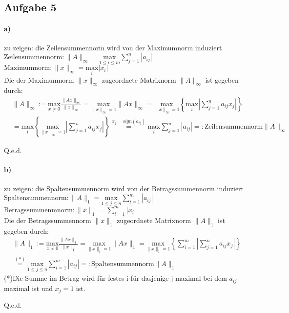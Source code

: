 \newpage
\subsection*{Aufgabe 5}
\paragraph*{a)}
zu zeigen: die Zeilensummennorm wird von der Maximumnorm induziert\\
\newline
$\mathrm{Zeilensummennorm: }\|A\|_\infty=\underset{1 \le i \le m}{\mathrm{max}} \sum_{j=1}^{n}|a_{ij}|$\\
\newline
$\mathrm{Maximumnorm: }\|x\|_\infty=\underset{i}{\mathrm{max}} |x_{i}|$\\
\newline
Die der Maximumnorm $\|x\|_\infty$ zugeordnete Matrixnorm $\|A\|_\infty$ ist gegeben durch:
\begin{align*}
&\|A\|_\infty := \underset{x\neq 0}{\mathrm{max}} \frac{\|Ax\|_\infty}{\|x\|_\infty} = 
\underset{\|x\|_\infty=1}{\mathrm{max}} \|Ax\|_\infty =
\underset{\|x\|_\infty=1}{\mathrm{max}}\left\lbrace \underset{i}{\mathrm{max}}\left|\sum_{j=1}^{n}a_{ij}x_j\right|\right\rbrace\\&=
\underset{i}{\mathrm{max}}\left\lbrace\underset{\|x\|_\infty=1}{\mathrm{max}}\left|\sum_{j=1}^{n} a_{ij}x_j\right|\right\rbrace
\overset{x_j=sign(a_{ij})}{=}\underset{i}{\mathrm{max}}\sum_{j=1}^{n}|a_{ij}|=: \mathrm{Zeilensummennorm} \|A\|_\infty
\end{align*}
\begin{flushright}Q.e.d.\end{flushright}

\paragraph*{b)}
zu zeigen: die Spaltensummennorm wird von der Betragssummennorm induziert\\
\newline
$\mathrm{Spaltensummennorm: }\|A\|_1=\underset{1 \le j \le n}{\mathrm{max}} \sum_{i=1}^{m}|a_{ij}|$\\
\newline
$\mathrm{Betragssummenmnorm: }\|x\|_1=\sum_{i=1}^{m}|x_i|$\\
\newline
Die der Betragssummennorm $\|x\|_1$ zugeordnete Matrixnorm $\|A\|_1$ ist gegeben durch:
\begin{align}
\|A\|_1 := \underset{x\neq 0}{\mathrm{max}} \frac{\|Ax\|_1}{\|x\|_1} = \underset{\|x\|_1=1}{\mathrm{max}} \|Ax\|_1 = \underset{\|x\|_1=1}{\mathrm{max}}\left\lbrace\sum_{i=1}^{m}\left|\sum_{j=1}^{n}a_{ij}x_j\right|\right\rbrace \\
\overset{(*)}{=} \underset{1 \le j \le n}{\mathrm{max}} \sum_{i=1}^{m}|a_{ij}| =: \mathrm{Spaltensummennorm} \|A\|_1
\end{align}
(*)Die Summe im Betrag wird f\"ur festes i f\"ur dasjenige j maximal bei dem $a_{ij}$ maximal ist und $x_j = 1$ ist.
\begin{flushright}Q.e.d.\end{flushright}
